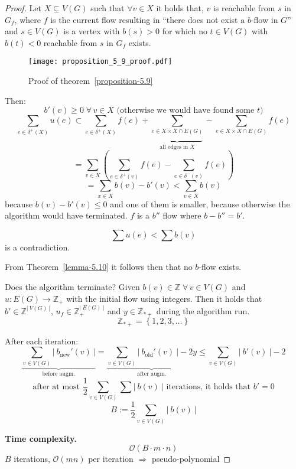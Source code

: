 \documentclass{article}
\newcommand{\card}[1]{\left|\:\!#1\:\!\right|}
\newcommand{\set}[1]{\left\{#1\right\}}
\newcommand{\fall}{\;\forall\,}
\begin{document}
\begin{proof}
  Let $X \subseteq V(G)$ such that $\forall v \in X$ it holds that,
  $v$ is reachable from $s$ in $G_f$,
  where $f$ is the current flow resulting in ``there does not exist a $b$-flow in $G$''
  and $s \in V(G)$ is a vertex with $b(s) > 0$ for which no $t \in V(G)$ with $b(t) < 0$
  reachable from $s$ in $G_f$ exists.

  \begin{figure}[h]
   \begin{center}
    \texttt{[image: proposition\_5\_9\_proof.pdf]}
    \caption{Proof of theorem~\ref{proposition-5.9}}
   \end{center}
  \end{figure}

  Then:
  \[ b'(v) \geq 0 \fall v \in X \text{ (otherwise we would have found some $t$)} \]
  \[
    \sum_{e \in \delta^+(X)} u(e)
      \subset
        \sum_{e \in \delta^+(X)} f(e)
        + \underbrace{\sum_{e \in X \times{} X \cap E(G)}}_{\text{all edges in } X}
        - \sum_{e \in X \times{} X \cap E(G)} f(e)
  \] \[
    = \sum_{v \in X} \left(\sum_{e \in \delta^+(v)} f(e) - \sum_{e \in \delta^-(v)} f(e) \right)
  \] \[
    = \sum_{x \in X} b(v) - b'(v) < \sum_{v \in X} b(v)
  \]
  because $b(v) - b'(v) \leq 0$ and one of them is smaller, because otherwise the algorithm would have terminated.
  $f$ is a $b''$ flow where $b - b'' = b'$.

  \[ \sum u(e) < \sum b(v) \]
  is a contradiction.

  From Theorem~\ref{lemma-5.10} it follows then that no $b$-flow exists.

  Does the algorithm terminate?
  Given $b(v) \in \mathbb{Z} \fall v \in V(G)$ and $u: E(G) \rightarrow \mathbb{Z}_+$ with the initial flow using integers. Then it holds that $b' \in \mathbb{Z}^{\card{V(G)}}$, $u_f \in \mathbb{Z}_+^{\card{E(G)}}$ and $y \in \mathbb{Z}_{*+}$ during the algorithm run.
  \[ \mathbb{Z}_{*+} = \set{1, 2, 3, \ldots} \]

  After each iteration:
  \[
    \underbrace{\sum_{v \in V(G)} \card{b_{\text{new}}'(v)}}_{\text{before augm.}}
      = \underbrace{\sum_{v \in V(G)} \card{b_{\text{old}}'(v)} - 2y}_{\text{after augm.}}
      \leq \sum_{v \in V(G)} \card{b'(v)} - 2
  \] \[
    \text{after at most } \frac12 \sum_{v \in V(G)} \sum \card{b(v)}
    \text{ iterations, it holds that } b' = 0
  \] \[
    B := \frac12 \sum_{v \in V(G)} \card{b(v)}
  \]

  \textbf{Time complexity.}
    \[ \mathcal{O}(B \cdot m \cdot n) \]
    $B$ iterations, $\mathcal{O}(mn)$ per iteration
    $\Rightarrow$ pseudo-polynomial
\end{proof}
\end{document}
